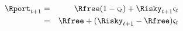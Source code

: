   \begin{eqnarray}
    \Rport_{t+1} & = & \Rfree(1-\varsigma_{t}) + \Risky_{t+1}\varsigma_{t} \label{eq:return1}
    \\              & = & \Rfree + (\Risky_{t+1}-\Rfree) \varsigma_{t} \label{eq:return2}
  \end{eqnarray}
